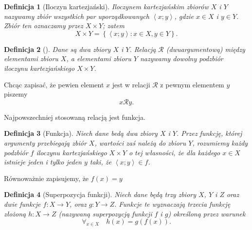 \documentclass[12pt,a4paper]{report}
\newtheorem{definition}{Definicja}[chapter]
\newcommand{\parauporzadkowana}[2]{\left\langle {#1}; {#2} \right\rangle}
\newcommand{\zbior}[1]{\left\lbrace {#1} \right\rbrace }
\begin{document}
\begin{definition}[Iloczyn kartezjański{\citep[Sec 3.4]{kuratowski1966wstkep}}]
Iloczynem kartezjańskim zbiorów $X$ i $Y$ nazywamy zbiór wszystkich par uporządkowanych $\parauporzadkowana{x}{y}$, gdzie $x \in X$ i $y \in Y$. Zbiór ten oznaczamy przez $ X \times Y$; zatem
\begin{equation*}
X \times Y= \zbior{\parauporzadkowana{x}{y}:  x\in X  , y \in Y}.
\end{equation*} 

\end{definition}

\begin{definition}[{\citep[Sec 6.1 Def. 6.1]{kraszewski2007wstkep}}]
Dane są dwa zbiory $X$ i $Y$. Relacją $\mathcal{R}$ (dwuargumentową) między elementami zbioru $X$, a elementami zbioru $Y$ nazywamy dowolny podzbiór iloczynu kartezjańskiego $X \times Y$.
\end{definition}
Chcąc zapisać, że pewien element $x$ jest w relacji $\mathcal{R}$ z pewnym elementem $y$ piszemy
$$
x\mathcal{R}y.
$$

Najpowszechniej stosowaną relacją jest funkcja.

\begin{definition}[Funkcja{\citep[Sec 4.1]{kuratowski1966wstkep}}]
Niech dane bedą dwa zbiory $X$ i $Y$. Przez funkcję, której argumenty przebiegają zbiór $X$, wartości zaś należą do zbioru $Y$, rozumiemy każdy podzbiór $f$ iloczynu kartezjańskiego $X \times Y$ o tej własności, że dla każdego $x \in X$ istnieje jeden i tylko jeden $y$ taki, że $\parauporzadkowana{x}{y} \in f$. 

\end{definition}

Równoważnie zapisujemy, że $f(x)=y$

\begin{definition}[Superpozycja funkcji{\citep[Sec 4.2 Def. 1.]{kuratowski1966wstkep}}]
Niech dane będą trzy zbiory $X$, $Y$ i $Z$ oraz dwie funkcje $f:X\to Y$, oraz $g:Y\to Z$. Funkcje te wyznaczają trzecia funkcję złożoną $h:X\to Z$ (nazywaną superpozycją funkcji $f$ i $g$) określoną przez warunek
\begin{equation*}
\forall_{x \in X} \quad h(x)=g(f(x)).
\end{equation*}
\end{definition}
\end{document}
